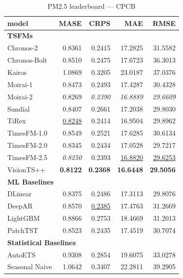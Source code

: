 \begin{table}[H]
\caption{PM2.5 leaderboard --- CPCB}
\centering
\begin{small}
\begin{tabular}{lrrrr}
\toprule
model & MASE & CRPS & MAE & RMSE \\
\midrule
\multicolumn{5}{l}{\textbf{TSFMs}} \\
Chronos-2 & 0.8361 & 0.2415 & 17.2825 & 31.5582 \\
Chronos-Bolt & 0.8510 & 0.2475 & 17.6723 & 36.3013 \\
Kairos & 1.0869 & 0.3205 & 23.0187 & 37.0376 \\
Moirai-1 & 0.8473 & 0.2493 & 17.4287 & 30.4328 \\
Moirai-2 & 0.8269 & \textit{0.2390} & \textit{16.8889} & \textit{29.6609} \\
Sundial & 0.8407 & 0.2661 & 17.2038 & 29.8030 \\
TiRex & \underline{0.8248} & 0.2414 & 16.9504 & 29.8962 \\
TimesFM-1.0 & 0.8549 & 0.2521 & 17.6285 & 30.6134 \\
TimesFM-2.0 & 0.8345 & 0.2434 & 17.0528 & 29.7217 \\
TimesFM-2.5 & \textit{0.8250} & 0.2393 & \underline{16.8820} & \underline{29.6253} \\
VisionTS++ & \textbf{0.8122} & \textbf{0.2368} & \textbf{16.6448} & \textbf{29.5056} \\
\midrule
\multicolumn{5}{l}{\textbf{ML Baselines}} \\
DLinear & 0.8375 & 0.2486 & 17.3113 & 29.8076 \\
DeepAR & 0.8570 & \underline{0.2385} & 17.4763 & 31.2669 \\
LightGBM & 0.8866 & 0.2753 & 18.4669 & 31.2013 \\
PatchTST & 0.8523 & 0.2435 & 17.4519 & 30.7074 \\
\midrule
\multicolumn{5}{l}{\textbf{Statistical Baselines}} \\
AutoETS & 0.9308 & 0.2854 & 19.6075 & 33.0278 \\
Seasonal Naive & 1.0642 & 0.3407 & 22.2811 & 39.2905 \\
\bottomrule
\end{tabular}
\end{small}
\end{table}
